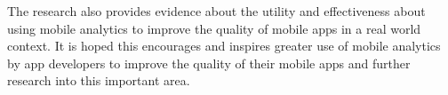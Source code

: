 The research also provides evidence about the utility and effectiveness about using mobile analytics to improve the quality of mobile apps in a real world context. It is hoped this encourages and inspires greater use of mobile analytics by app developers to improve the quality of their mobile apps and further research into this important area.
